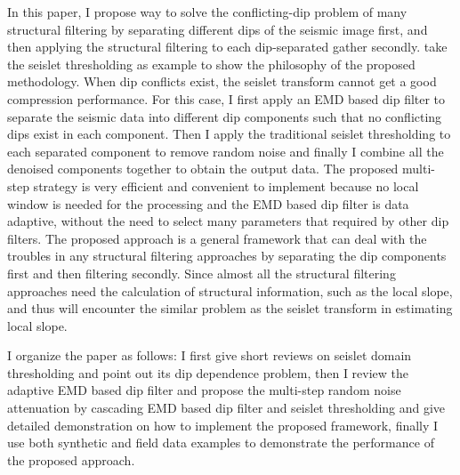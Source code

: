 In this paper, I propose  way to solve the conflicting-dip problem of many structural filtering  by separating different dips of the seismic image first, and then applying the structural filtering to each dip-separated gather secondly.  take the seislet thresholding as  example to show the philosophy of the proposed methodology. When dip conflicts exist, the seislet transform can\dlo{ }not get a good compression performance. For this case, I first apply an EMD based dip filter to separate the seismic data into different  dip components such that no conflicting dips exist in each component.  Then I apply the traditional seislet thresholding to each separated component to remove random noise and finally I combine all the denoised components together to obtain the output data. The proposed  multi-step strategy is very efficient and convenient to implement because no local window is needed for the processing and the EMD based dip filter is data adaptive, without the need to select many parameters that required by other dip filters. The proposed approach is a general framework that can deal with the troubles in any structural filtering approaches by separating the dip components first and then filtering secondly. Since almost all the structural filtering approaches need the calculation of structural information, such as the local slope, and thus will encounter the similar problem as the seislet transform in estimating local slope. 

I organize the paper as follows: I first give short reviews on seislet domain thresholding and point out its dip dependence problem, then I review the adaptive EMD based dip filter and propose the  multi-step random noise attenuation by cascading EMD based dip filter and seislet thresholding and give detailed demonstration on how to implement the proposed framework, finally I use both synthetic and field data examples to demonstrate the performance of the proposed approach. 

